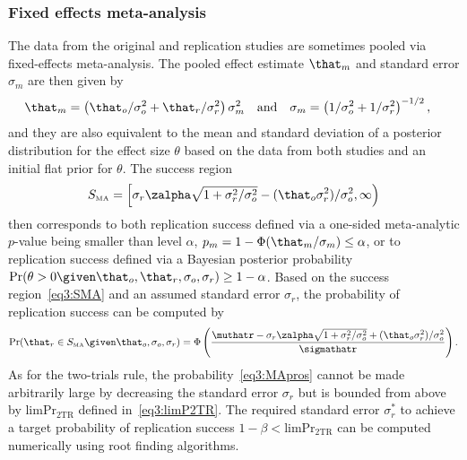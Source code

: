 \subsubsection{Fixed effects meta-analysis}
The data from the original and replication studies are sometimes pooled via
fixed-effects meta-analysis. The pooled effect estimate $\that_{m}$ and standard
error $\sigma_{m}$ are then given by
\begin{align*}
  &\that_{m} =
    \left(\that_{o}/\sigma_{o}^{2} + \that_{r}/\sigma^{2}_{r}\right)\sigma^{2}_{m}&
&\text{and}&                                                                                       &\sigma_{m} = \left(1/\sigma^{2}_{o} + 1/\sigma^{2}_{r}\right)^{-1/2},&
\end{align*}
and they are also equivalent to the mean and standard deviation of a posterior
distribution for the effect size $\theta$ based on the data from both studies
and an initial flat prior for $\theta$. The success
region %
\begin{align}
  \label{eq3:SMA}
  S_{\scriptscriptstyle \text{MA}}
  = \left[\sigma_{r} \zalpha\sqrt{1 + \sigma^{2}_{r}/\sigma^{2}_{o}} -
  (\that_{o} \sigma^{2}_{r})/\sigma^{2}_{o},
  \infty \right)
\end{align}
then corresponds to both replication success defined via a one-sided
meta-analytic $p$-value being smaller than level $\alpha$, \ie{}
$p_{m} = 1 - \Phi(\that_{m}/\sigma_{m}) \leq \alpha$, or to replication success
defined via a Bayesian posterior probability
$\Pr(\theta > 0 \given \that_{o}, \that_{r}, \sigma_{o}, \sigma_{r}) \geq 1 - \alpha$.
Based on the success region~\eqref{eq3:SMA} and an assumed standard error
$\sigma_{r}$, the probability of replication success can be computed by
\begin{align}
  \label{eq3:MApros}
  \Pr(\that_{r} \in S_{\scriptscriptstyle \text{MA}} \given \that_{o}, \sigma_{o}, \sigma_{r})
  = %
  \Phi\left(\frac{\muthatr - \sigma_{r} \zalpha\sqrt{1 + \sigma^{2}_{r}/\sigma^{2}_{o}}
  + (\that_{o} \sigma^{2}_{r})/\sigma^{2}_{o}}{\sigmathatr}\right).
\end{align}
As for the two-trials rule, the probability~\eqref{eq3:MApros} cannot be made
arbitrarily large by decreasing the standard error $\sigma_{r}$ but is bounded
from above by $\text{limPr}_{\text{2TR}}$ defined in~\eqref{eq3:limP2TR}.
The required standard error $\sigma_{r}^{*}$ to achieve a target probability of
replication success $1 - \beta < \text{limPr}_{\text{2TR}}$ can be computed
numerically using root finding algorithms.



